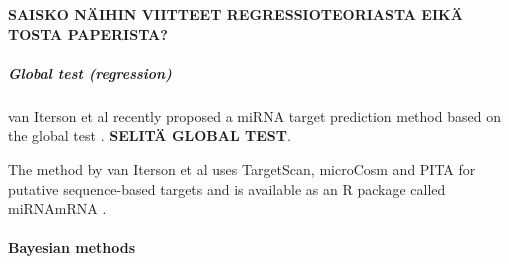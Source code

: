\textbf{SAISKO NÄIHIN VIITTEET REGRESSIOTEORIASTA EIKÄ TOSTA PAPERISTA?}


\subparagraph{Global test (regression)}\label{global-test-regression}

van Iterson et al recently proposed a miRNA target prediction method
based on the global test \cite{vanIterson2013}. \textbf{SELITÄ GLOBAL TEST}.

The method by van Iterson et al uses TargetScan, microCosm and PITA for
putative sequence-based targets and is available as an R package called
miRNAmRNA \cite{vanItersonWeb}.

\paragraph{Bayesian methods}\label{bayesian-methods}

